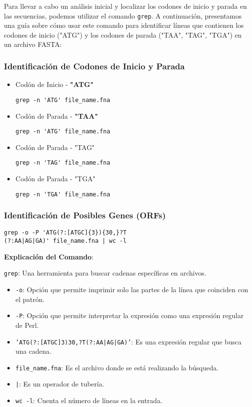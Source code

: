Para llevar a cabo un análisis inicial y localizar los codones de inicio y parada en las secuencias, podemos utilizar el comando \texttt{grep}. A continuación, presentamos una guía sobre cómo usar este comando para identificar líneas que contienen los codones de inicio ("ATG") y los codones de parada ("TAA", "TAG", "TGA") en un archivo FASTA:

\subsubsection*{Identificación de Codones de Inicio y Parada}

\begin{itemize}
\item Codón de Inicio - \textbf{"ATG"}  
\begin{verbatim}
grep -n 'ATG' file_name.fna
\end{verbatim}

\item Codón de Parada - \textbf{"TAA"}  
\begin{verbatim}
grep -n 'ATG' file_name.fna
\end{verbatim}

\item Codón de Parada - "TAG"  
\begin{verbatim}
grep -n 'TAG' file_name.fna
\end{verbatim}

\item Codón de Parada - "TGA"  
\begin{verbatim}
grep -n 'TGA' file_name.fna
\end{verbatim}
\end{itemize}

\subsubsection*{Identificación de Posibles Genes (ORFs)}

\begin{verbatim}
grep -o -P 'ATG(?:[ATGC]{3}){30,}?T
(?:AA|AG|GA)' file_name.fna | wc -l
\end{verbatim}

\textbf{Explicación del Comando}:

\texttt{grep}: Una herramienta para buscar cadenas específicas en archivos.
\begin{itemize}
\item \texttt{-o}: Opción que permite imprimir solo las partes de la línea que coinciden con el patrón.
\item \texttt{-P}: Opción que permite interpretar la expresión como una expresión regular de Perl.
\item \texttt{'ATG(?:[ATGC]{3}){30,}?T(?:AA|AG|GA)'}: Es una expresión regular que busca una cadena.
\item \texttt{file\_name.fna}: Es el archivo donde se está realizando la búsqueda.
\item \texttt{|}: Es un operador de tubería.
\item \texttt{wc -l}: Cuenta el número de líneas en la entrada.
\end{itemize}

